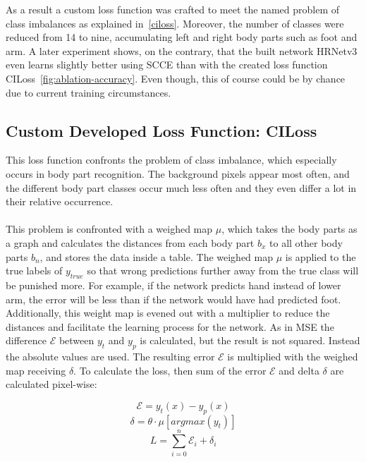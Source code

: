 As a result a custom loss function was crafted to meet the named problem of class imbalances as explained in~\autoref{ciloss}.
Moreover, the number of classes were reduced from 14 to nine, accumulating left and right body parts such as foot and arm.
A later experiment shows, on the contrary, that the built network HRNetv3 even learns slightly better using \gls{SCCE} than with the created
loss function CILoss~\ref{fig:ablation-accuracy}.
Even though, this of course could be by chance due to current training circumstances.


\subsection{Custom Developed Loss Function: CILoss}
\label{ciloss}
This loss function confronts the problem of class imbalance, which especially occurs in body part recognition.
The background pixels appear most often, and the different body part classes occur much less often and they even
differ a lot in their relative occurrence.
\\\mbox{}\\
This problem is confronted with a weighed map $\mu$, which takes the body parts as a graph and calculates
the distances from each body part $b_x$ to all other body parts $b_n$, and stores the data inside a table.
The weighed map $\mu$ is applied to the true labels of $y_{true}$ so that wrong predictions further away from the true
class will be punished more. For example, if the network predicts hand instead of lower arm, the error will be less than if
the network would have had predicted foot.
Additionally, this weight map is evened out with a multiplier to reduce the distances and facilitate
the learning process for the network.
As in \gls{MSE} the difference $\mathcal{E}$ between $y_t$ and $y_p$ is calculated, but the result is not squared.
Instead the absolute values are used.
The resulting error $\mathcal{E}$ is multiplied with the weighed map receiving $\delta$.
To calculate the loss, then sum of the error $\mathcal{E}$ and delta $\delta$ are calculated pixel-wise:

$$\mathcal{E}=y_t(x)-y_p(x)$$
$$\delta=\theta\cdot\mu[argmax(y_t)] $$
$$L=\sum_{i=0}^{n}\mathcal{E}_i+\delta_i$$


